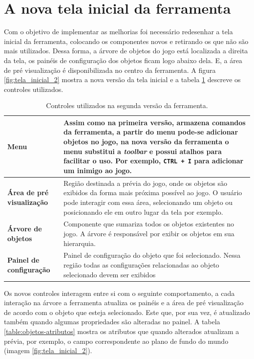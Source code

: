 \documentclass[12pt,oneside,openright,a4paper,english,brazil,sumario=tradicional]{abntex2}
\begin{document}
\section{A nova tela inicial da ferramenta}
Com o objetivo de implementar as melhorias foi necessário redesenhar a tela inicial da ferramenta, colocando os componentes novos e retirando os que não são mais utilizados. Dessa forma, a árvore de objetos do jogo está localizada a direita da tela, os painéis de configuração dos objetos ficam logo abaixo dela. E, a área de pré visualização é disponibilizada no centro da ferramenta.  A figura \ref{fig:tela_inicial_2} mostra a nova versão da tela inicial e a tabela \ref{table:ferramenta_areas_2} descreve os controles utilizados.

\begin{table}[h]
   \centering
   \begin{tabular}{| l | p{8cm} |}
      \hline
      \textbf{Menu} & Assim como na primeira versão, armazena comandos da ferramenta, a partir do menu pode-se adicionar objetos no jogo, na nova versão da ferramenta o menu substitui a \emph{toolbar} e possui atalhos para facilitar o uso. Por exemplo, \texttt{CTRL + I} para adicionar um inimigo ao jogo. \\
      \hline
      \textbf{Área de pré visualização} & Região  destinada a prévia do jogo, onde os objetos são exibidos da forma mais próxima possível ao jogo. O usuário pode interagir com essa área, selecionando um objeto ou posicionando ele em outro lugar da tela por exemplo.\\
      \hline
      \textbf{Árvore de objetos} & Componente que sumariza todos os objetos existentes no jogo. A árvore é responsável por exibir os objetos em sua hierarquia.\\
      \hline
      \textbf{Painel de configuração} & Painel de configuração do objeto que foi selecionado. Nessa região todas as configurações relacionadas ao objeto selecionado devem ser exibidos \\
      \hline
   \end{tabular}
   \caption{Controles utilizados na segunda versão da ferramenta.}
   \label{table:ferramenta_areas_2}
\end{table}

Os novos controles interagem entre si com o seguinte comportamento, a cada interação na árvore a ferramenta atualiza os painéis e a área de pré visualização de acordo com o objeto que esteja selecionado. Este que, por sua vez, é atualizado também quando algumas propriedades são alteradas no painel. A tabela \ref{table:objetos-atributos} mostra os atributos que quando alterados atualizam a prévia, por exemplo, o campo correspondente ao plano de fundo do mundo (imagem \ref{fig:tela_inicial_2}).
\end{document}
